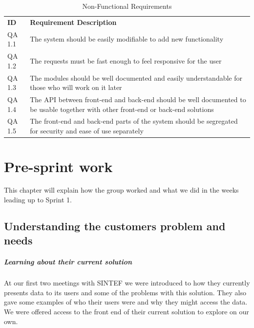\documentclass[11pt,a4paper,titlepage,oneside]{report}
\begin{document}
  \begin{longtable}{p{1.4cm} p{9.8cm} }
  \caption[Non-Functional Requirements]{Non-Functional Requirements} \label{nonFuncReqs} \\
  \hline
  \multicolumn{1}{p{1.4cm}}{\textbf{ID}} &
  \multicolumn{1}{p{9.8cm}}{\textbf{Requirement Description}}
  \endfirsthead

  \multicolumn{2}{r}{{Continued on next page}} \\
  \endfoot

  \hline \hline
  \endlastfoot

  \hline
  QA 1.1 & The system should be easily modifiable to add new functionality\\ \hline

  QA 1.2 & The requests must be fast enough to feel responsive for the user \\ \hline

  QA 1.3 & The modules should be well documented and easily understandable for those who will work on it later \\ \hline

  QA 1.4 & The API between front-end and back-end should be well documented to be usable together with other front-end or back-end solutions \\ \hline

  QA 1.5 & The front-end and back-end parts of the system should be segregated for security and ease of use separately \\ \hline

  \end{longtable}


\chapter{Pre-sprint work}
This chapter will explain how the group worked and what we did in the weeks leading up to Sprint 1.

\section{Understanding the customers problem and needs}

\paragraph{Learning about their current solution}
At our first two meetings with SINTEF we were introduced to how they currently presents data to its users and some of the problems with this solution. They also gave some examples of who their users were and why they might access the data. We were offered access to the front end of their current solution to explore on our own.
\end{document}
